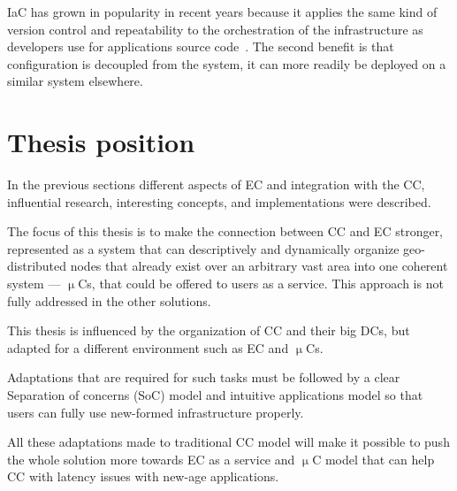 IaC has grown in popularity in recent years because it applies the same kind of version control and repeatability to the orchestration of the infrastructure as developers use for applications source code~\cite{ArtacBNGT17}. The second benefit is that configuration is decoupled from the system, it can more readily be deployed on a similar system elsewhere.
%
%
\section{Thesis position}\label{sec:thesis_position}
%
In the previous sections different aspects of EC and integration with the CC, influential research, interesting concepts, and implementations were described.

The focus of this thesis is to make the connection between CC and EC stronger, represented as a system that can descriptively and dynamically organize geo-distributed nodes that already exist over an arbitrary vast area into one coherent system --- $\upmu$Cs, that could be offered to users as a service. This approach is not fully addressed in the other solutions. 

This thesis is influenced by the organization of CC and their big DCs, but adapted for a different environment such as EC and $\upmu$Cs.

Adaptations that are required for such tasks must be followed by a clear Separation of concerns (SoC) model and intuitive applications model so that users can fully use new-formed infrastructure properly. 

All these adaptations made to traditional CC model will make it possible to push the whole solution more towards EC as a service and $\upmu$C model that can help CC with latency issues with new-age applications.
%
%